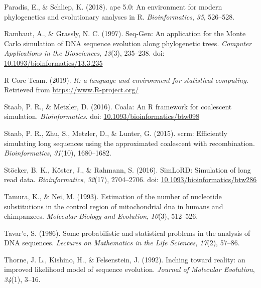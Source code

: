 \documentclass[12pt,]{article}
\begin{document}
\leavevmode\hypertarget{ref-Paradis_2018}{}%
Paradis, E., \& Schliep, K. (2018). ape 5.0: An environment for modern phylogenetics and evolutionary analyses in R. \emph{Bioinformatics}, \emph{35}, 526--528.

\leavevmode\hypertarget{ref-Rambaut_1997}{}%
Rambaut, A., \& Grassly, N. C. (1997). Seq-Gen: An application for the Monte Carlo simulation of DNA sequence evolution along phylogenetic trees. \emph{Computer Applications in the Biosciences}, \emph{13}(3), 235--238. doi: \href{https://doi.org/10.1093/bioinformatics/13.3.235}{10.1093/bioinformatics/13.3.235}

\leavevmode\hypertarget{ref-R_Core_Team_2019}{}%
R Core Team. (2019). \emph{R: a language and environment for statistical computing}. Retrieved from \url{https://www.R-project.org/}

\leavevmode\hypertarget{ref-Paul_R._Staab_2016}{}%
Staab, P. R., \& Metzler, D. (2016). Coala: An R framework for coalescent simulation. \emph{Bioinformatics}. doi: \href{https://doi.org/10.1093/bioinformatics/btw098}{10.1093/bioinformatics/btw098}

\leavevmode\hypertarget{ref-Paul_R._Staab_2015}{}%
Staab, P. R., Zhu, S., Metzler, D., \& Lunter, G. (2015). scrm: Efficiently simulating long sequences using the approximated coalescent with recombination. \emph{Bioinformatics}, \emph{31}(10), 1680--1682.

\leavevmode\hypertarget{ref-St_cker_2016}{}%
Stöcker, B. K., Köster, J., \& Rahmann, S. (2016). SimLoRD: Simulation of long read data. \emph{Bioinformatics}, \emph{32}(17), 2704--2706. doi: \href{https://doi.org/10.1093/bioinformatics/btw286}{10.1093/bioinformatics/btw286}

\leavevmode\hypertarget{ref-TN93}{}%
Tamura, K., \& Nei, M. (1993). Estimation of the number of nucleotide substitutions in the control region of mitochondrial dna in humans and chimpanzees. \emph{Molecular Biology and Evolution}, \emph{10}(3), 512--526.

\leavevmode\hypertarget{ref-Tavare_1986gtr}{}%
Tavar\a'e, S. (1986). Some probabilistic and statistical problems in the analysis of DNA sequences. \emph{Lectures on Mathematics in the Life Sciences}, \emph{17}(2), 57--86.

\leavevmode\hypertarget{ref-Thorne_1992}{}%
Thorne, J. L., Kishino, H., \& Felsenstein, J. (1992). Inching toward reality: an improved likelihood model of sequence evolution. \emph{Journal of Molecular Evolution}, \emph{34}(1), 3--16.
\end{document}
